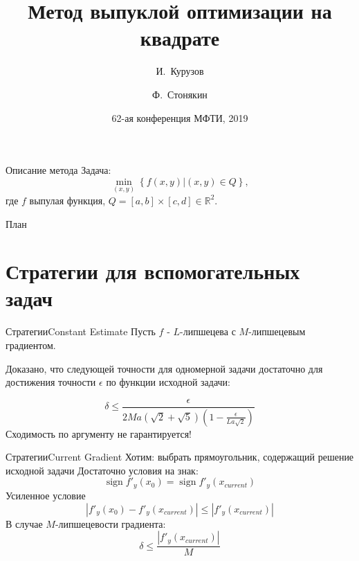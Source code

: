 \documentclass{beamer}
\title{Метод выпуклой оптимизации на квадрате}
\author{И.~Курузов\inst{1} \and Ф.~Стонякин\inst{1, 2}}
\institute[MIPT] %
{
  \inst{1}%
Московский Физико-Технический Институт
  \and
  \inst{2}%
Крымский Федеральный Университет имени В.И.~Вернандского
}
\date{62-ая конференция МФТИ, 2019}
\DeclareMathOperator{\sign}{sign}
\begin{document}
\begin{frame}
  \titlepage
\end{frame}


\begin{frame}{Описание метода}
Задача:
$$\min_{(x,y)}\left\{f(x,y)|(x,y) \in Q\right\},$$
где $f$ выпулая функция, $Q = [a,b]\times[c, d]\in \mathbb{R}^2$.

\pause

\end{frame}

\begin{frame}{План}
  \tableofcontents
\end{frame}


\section{Стратегии для вспомогательных задач}

\begin{frame}{Стратегии}{Constant Estimate}
Пусть $f$ - $L$-липшецева с $M$-липшецевым градиентом.

Доказано, что следующей точности для одномерной задачи достаточно для достижения точности $\epsilon$ по функции исходной задачи:

$$\boxed{\delta \leq \frac{\epsilon}{2Ma(\sqrt{2}+\sqrt{5})(1-\frac{\epsilon}{La\sqrt{2}})}}$$
\pause
Сходимость по аргументу не гарантируется!
\end{frame}

\begin{frame}{Стратегии}{Current Gradient}
Хотим: выбрать прямоугольник, содержащий решение исходной задачи
\pause
Достаточно условия на знак:
    $$\sign f'_y(x_0) = \sign f'_y(x_{current})$$
\pause    
Усиленное условие
    $$|f'_y(x_0) - f'_y(x_{current})| \leq |f'_y(x_{current})|$$
\pause
В случае $M$-липшецевости градиента:
  $$\boxed{\delta \leq \frac{|f'_y(x_{current})|}{M}}$$
\end{frame}
\end{document}
